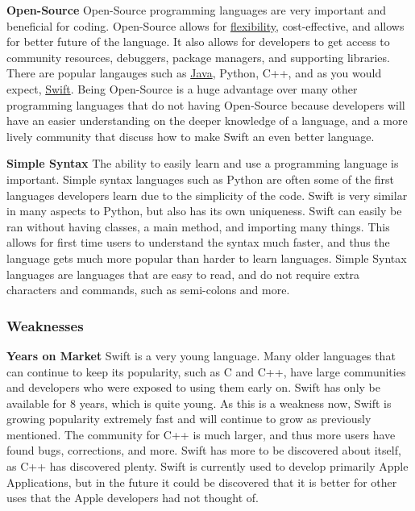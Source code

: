 \documentclass{article}
\theoremstyle{theorem}
\theoremstyle{definition}
\theoremstyle{remark}
\begin{document}
\noindent \textbf{Open-Source} \newline
Open-Source programming languages are very important and beneficial for coding. Open-Source allows for \href{https://enterprisersproject.com/article/2015/1/top-advantages-open-source-offers-over-proprietary-solutions}{flexibility}, cost-effective, and allows for better future of the language. It also allows for developers to get access to community resources, debuggers, package managers, and supporting libraries. There are popular langauges such as \href{https://www.analyticsinsight.net/top-10-programming-languages-for-open-source-projects-in-2021/}{Java}, Python, C++, and as you would expect, \href{https://www.outsource2india.com/software/mobile-applications/articles/apple-swift-now-open-source.asp}{Swift}. Being Open-Source is a huge advantage over many other programming languages that do not having Open-Source because developers will have an easier understanding on the deeper knowledge of a language, and a more lively community that discuss how to make Swift an even better language. \newline \newline

\noindent \textbf{Simple Syntax} \newline
The ability to easily learn and use a programming language is important. Simple syntax languages such as Python are often some of the first languages developers learn due to the simplicity of the code. Swift is very similar in many aspects to Python, but also has its own uniqueness. Swift can easily be ran without having classes, a main method, and importing many things. This allows for first time users to understand the syntax much faster, and thus the language gets much more popular than harder to learn languages. Simple Syntax languages are languages that are easy to read, and do not require extra characters and commands, such as semi-colons and more. \newline

\subsubsection{Weaknesses}
\textbf{Years on Market}\newline
Swift is a very young language. Many older languages that can continue to keep its popularity, such as C and C++, have large communities and developers who were exposed to using them early on. Swift has only be available for 8 years, which is quite young. As this is a weakness now, Swift is growing popularity extremely fast and will continue to grow as previously mentioned. The community for C++ is much larger, and thus more users have found bugs, corrections, and more. Swift has more to be discovered about itself, as C++ has discovered plenty. Swift is currently used to develop primarily Apple Applications, but in the future it could be discovered that it is better for other uses that the Apple developers had not thought of. \newline \newline
\end{document}
